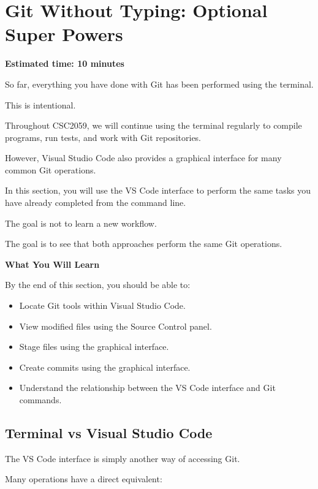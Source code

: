 \documentclass{csc2059practical}
\begin{document}
\section{Git Without Typing: Optional Super Powers}
\begin{infobox}
\textbf{Estimated time: 10 minutes}
\end{infobox}
So far, everything you have done with Git has been performed using the terminal.

This is intentional.

Throughout CSC2059, we will continue using the terminal regularly to compile programs, run tests, and work with Git repositories.

However, Visual Studio Code also provides a graphical interface for many common Git operations.

In this section, you will use the VS Code interface to perform the same tasks you have already completed from the command line.

The goal is not to learn a new workflow.

The goal is to see that both approaches perform the same Git operations.

\begin{learningoutcomes}
\textbf{What You Will Learn}\par
\medskip
By the end of this section, you should be able to:

\begin{itemize}
  \item Locate Git tools within Visual Studio Code.
  \item View modified files using the Source Control panel.
  \item Stage files using the graphical interface.
  \item Create commits using the graphical interface.
  \item Understand the relationship between the VS Code interface and Git commands.
\end{itemize}
\end{learningoutcomes}
\subsection{Terminal vs Visual Studio Code}
The VS Code interface is simply another way of accessing Git.

Many operations have a direct equivalent:
\end{document}
